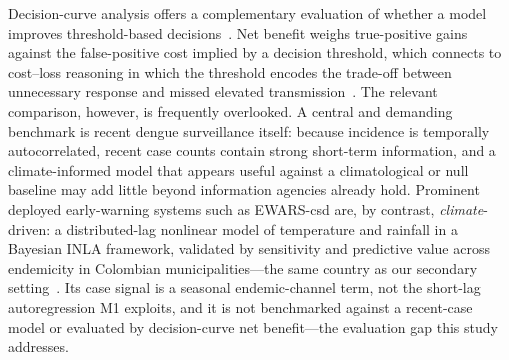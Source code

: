 \documentclass[11pt,a4paper]{article}
\begin{document}
Decision-curve analysis offers a complementary evaluation of whether a model improves threshold-based decisions~\cite{Vickers2006,Vickers2016,Vickers2019}. Net benefit weighs true-positive gains against the false-positive cost implied by a decision threshold, which connects to cost--loss reasoning in which the threshold encodes the trade-off between unnecessary response and missed elevated transmission~\cite{Murphy1985,Tozan2023}. The relevant comparison, however, is frequently overlooked. A central and demanding benchmark is recent dengue surveillance itself: because incidence is temporally autocorrelated, recent case counts contain strong short-term information, and a climate-informed model that appears useful against a climatological or null baseline may add little beyond information agencies already hold. Prominent deployed early-warning systems such as EWARS-csd are, by contrast, \emph{climate}-driven: a distributed-lag nonlinear model of temperature and rainfall in a Bayesian INLA framework, validated by sensitivity and predictive value across endemicity in Colombian municipalities---the same country as our secondary setting~\cite{EWARScsd}. Its case signal is a seasonal endemic-channel term, not the short-lag autoregression M1 exploits, and it is not benchmarked against a recent-case model or evaluated by decision-curve net benefit---the evaluation gap this study addresses.
\end{document}
